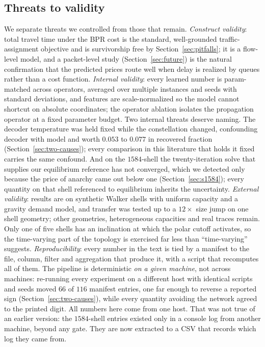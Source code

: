 \documentclass[journal]{IEEEtran}
\begin{document}
\subsection{Threats to validity}
We separate threats we controlled from those that remain. \emph{Construct validity}:
total travel time under the BPR cost is the standard, well-grounded traffic-assignment
objective and is survivorship free by Section~\ref{sec:pitfalls}; it is a flow-level model,
and a packet-level study (Section~\ref{sec:future}) is the natural confirmation that the
predicted prices route well when delay is realized by queues rather than a cost function. \emph{Internal validity}: every
learned number is param-matched across operators, averaged over multiple instances and
seeds with standard deviations, and features are scale-normalized so the model cannot
shortcut on absolute coordinates; the operator ablation isolates the propagation operator
at a fixed parameter budget. Two internal threats deserve naming. The decoder temperature was held fixed while the constellation changed, confounding decoder with model and worth $0.053$ to $0.077$ in recovered fraction (Section~\ref{sec:two-causes}); every comparison in this literature that holds it fixed carries the same confound. And on the $1584$-shell the twenty-iteration solve
that supplies our equilibrium reference has not converged, which we detected only because the
price of anarchy came out below one (Section~\ref{sec:s1584}); every quantity on that shell
referenced to equilibrium inherits the uncertainty. \emph{External validity}: results are on synthetic Walker shells with uniform capacity and a gravity demand model, and transfer was tested up to a $12\times$ size jump on one shell geometry; other geometries, heterogeneous capacities and real traces remain. Only one of five shells has an inclination at which the polar cutoff activates, so the time-varying part of the topology is exercised far less than ``time-varying'' suggests.
\emph{Reproducibility}: every number in the text is tied by a manifest to the file, column,
filter and aggregation that produce it, with a script that recomputes all of them. The pipeline is deterministic \emph{on a given machine}, not across machines: re-running every
experiment on a different host with identical scripts and seeds moved $66$ of $116$ manifest
entries, one far enough to reverse a reported sign (Section~\ref{sec:two-causes}), while every
quantity avoiding the network agreed to the printed digit. All numbers here come from one host. That was not true of an earlier version: the $1584$-shell entries existed only in a console log from another machine, beyond any gate. They are now extracted to a CSV that records which log they came from.
\end{document}
